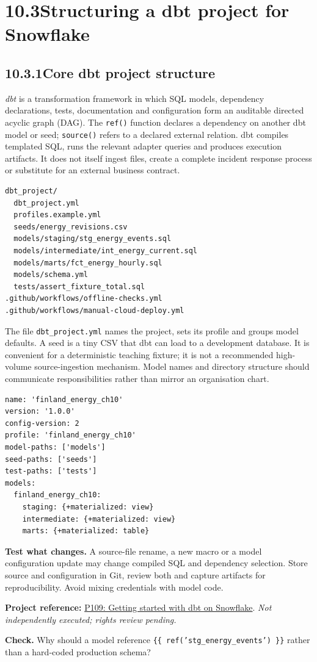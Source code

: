 \documentclass[11pt,twoside]{article}
\newcommand{\topic}[2]{\subsection*{#1\quad #2}}
\newcommand{\repo}[2]{\par\begingroup\fontsize{8.0}{9.6}\selectfont\sffamily\color{inkgray}\textbf{Project reference:} \href{#2}{#1}. \textit{Not independently executed; rights review pending.}\par\endgroup}
\begin{document}
\section*{10.3\quad Structuring a dbt project for Snowflake}
\topic{10.3.1}{Core dbt project structure}
\emph{dbt} is a transformation framework in which SQL models, dependency declarations, tests, documentation and configuration form an auditable directed acyclic graph (DAG). The \texttt{ref()} function declares a dependency on another dbt model or seed; \texttt{source()} refers to a declared external relation. dbt compiles templated SQL, runs the relevant adapter queries and produces execution artifacts. It does not itself ingest files, create a complete incident response process or substitute for an external business contract.
\begin{lstlisting}[caption={Minimal repository tree in the companion archive.}]
dbt_project/
  dbt_project.yml
  profiles.example.yml
  seeds/energy_revisions.csv
  models/staging/stg_energy_events.sql
  models/intermediate/int_energy_current.sql
  models/marts/fct_energy_hourly.sql
  models/schema.yml
  tests/assert_fixture_total.sql
.github/workflows/offline-checks.yml
.github/workflows/manual-cloud-deploy.yml
\end{lstlisting}
The file \texttt{dbt\_project.yml} names the project, sets its profile and groups model defaults. A seed is a tiny CSV that dbt can load to a development database. It is convenient for a deterministic teaching fixture; it is not a recommended high-volume source-ingestion mechanism. Model names and directory structure should communicate responsibilities rather than mirror an organisation chart.
\begin{lstlisting}[caption={Simplified project configuration.}]
name: 'finland_energy_ch10'
version: '1.0.0'
config-version: 2
profile: 'finland_energy_ch10'
model-paths: ['models']
seed-paths: ['seeds']
test-paths: ['tests']
models:
  finland_energy_ch10:
    staging: {+materialized: view}
    intermediate: {+materialized: view}
    marts: {+materialized: table}
\end{lstlisting}
\textbf{Test what changes.} A source-file rename, a new macro or a model configuration update may change compiled SQL and dependency selection. Store source and configuration in Git, review both and capture artifacts for reproducibility. Avoid mixing credentials with model code.
\repo{P109: Getting started with dbt on Snowflake}{https://github.com/Snowflake-Labs/getting-started-with-dbt-on-snowflake}
\textbf{Check.} Why should a model reference \texttt{\{\{ ref('stg\_energy\_events') \}\}} rather than a hard-coded production schema?
\end{document}
